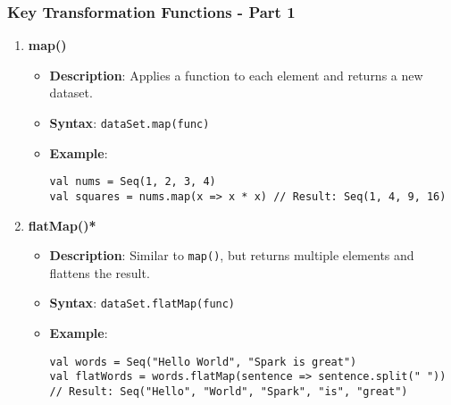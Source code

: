 \documentclass[aspectratio=169]{beamer}
\begin{document}
\begin{frame}[fragile]
    \frametitle{Key Transformation Functions - Part 1}
    \begin{enumerate}
        \item \textbf{map()} 
        \begin{itemize}
            \item \textbf{Description}: Applies a function to each element and returns a new dataset.
            \item \textbf{Syntax}: \texttt{dataSet.map(func)}
            \item \textbf{Example}:
            \begin{lstlisting}
val nums = Seq(1, 2, 3, 4)
val squares = nums.map(x => x * x) // Result: Seq(1, 4, 9, 16)
            \end{lstlisting}
        \end{itemize}

        \item \textbf{flatMap()*}
        \begin{itemize}
            \item \textbf{Description}: Similar to \texttt{map()}, but returns multiple elements and flattens the result.
            \item \textbf{Syntax}: \texttt{dataSet.flatMap(func)}
            \item \textbf{Example}:
            \begin{lstlisting}
val words = Seq("Hello World", "Spark is great")
val flatWords = words.flatMap(sentence => sentence.split(" ")) // Result: Seq("Hello", "World", "Spark", "is", "great")
            \end{lstlisting}
        \end{itemize}
    \end{enumerate}
\end{frame}
\end{document}
